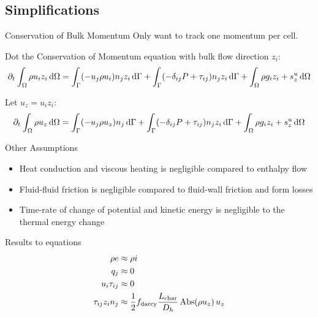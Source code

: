 \documentclass[10pt,t,xcolor=table,compress]{UWMadBeamer}
\newenvironment{Itemize}
    {\begin{itemize}\setlength{\itemsep}{0.8em}\setlength{\leftmargin}{0.0em}\setlength{\labelwidth}{0em}}
    {\end{itemize}}
\begin{document}
    \subsection*{Simplifications}
    \begin{frame}{Conservation of Bulk Momentum}
        Only want to track one momentum per cell.
        
        Dot the Conservation of Momentum equation with bulk flow direction $z_i$:
        \begin{equation}
            \pdt \IntV \rho u_i z_i \dV = \IntS (-u_j \rho u_i) n_j z_i\dS + \IntS (-\delta_{ij} P + \tau_{ij}) n_j z_i\dS + \IntV \rho g_i z_i+ s^u_z\dV
        \end{equation}
        
        Let $u_z = u_i z_i$:
        \begin{equation}
            \pdt \IntV \rho u_z \dV = \IntS (-u_j \rho u_z) n_j\dS + \IntS (-\delta_{ij} P + \tau_{ij}) n_j z_i\dS + \IntV \rho g_i z_i+ s^u_z\dV
        \end{equation}
        
    \end{frame}
    \begin{frame}{Other Assumptions}
        \begin{Itemize}
            \item{Heat conduction and viscous heating is negligible compared to enthalpy flow}
            \item{Fluid-fluid friction is negligible compared to fluid-wall friction and form losses}
            \item{Time-rate of change of potential and kinetic energy is negligible to the thermal energy change}
        \end{Itemize}
    \end{frame}
    \begin{frame}{Results to equations}
        \begin{align}
            \rho{e}           &\approx \rho{i}\\
            q_j               &\approx 0\\
            u_i \tau_{ij}     &\approx 0\\
            \tau_{ij} z_i n_j &\approx \frac{1}{2} f_{\text{darcy}} \frac{L_{\text{char}}}{D_h} \Abs(\rho u_z)\,u_z
        \end{align}
    \end{frame}
\end{document}
